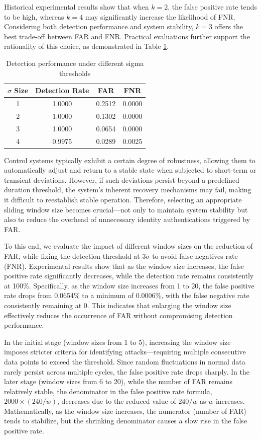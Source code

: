 \documentclass[sigconf]{acmart}
\begin{document}
Historical experimental results show that when $k = 2$, the false positive rate tends to be high, whereas $k = 4$ may significantly increase the likelihood of FNR. Considering both detection performance and system stability, $k = 3$ offers the best trade-off between FAR and FNR. Practical evaluations further support the rationality of this choice, as demonstrated in Table \ref{tab:sigma-performance}.

\begin{table}[htbp]
\centering
\caption{Detection performance under different sigma thresholds}
\begin{tabular}{cccc}
\toprule
\textbf{$\sigma$ Size} & \textbf{Detection Rate} & \textbf{FAR} & \textbf{FNR} \\
\midrule
1 & 1.0000 & 0.2512 & 0.0000 \\
2 & 1.0000 & 0.1302 & 0.0000 \\
3 & 1.0000 & 0.0654 & 0.0000 \\
4 & 0.9975 & 0.0289 & 0.0025 \\
\bottomrule
\end{tabular}
\label{tab:sigma-performance}
\end{table}

Control systems typically exhibit a certain degree of robustness, allowing them to automatically adjust and return to a stable state when subjected to short-term or transient deviations. However, if such deviations persist beyond a predefined duration threshold, the system’s inherent recovery mechanisms may fail, making it difficult to reestablish stable operation. Therefore, selecting an appropriate sliding window size becomes crucial—not only to maintain system stability but also to reduce the overhead of unnecessary identity authentications triggered by FAR.

To this end, we evaluate the impact of different window sizes on the reduction of FAR, while fixing the detection threshold at $3\sigma$ to avoid false negatives rate (FNR). Experimental results show that as the window size increases, the false positive rate significantly decreases, while the detection rate remains consistently at 100\%. Specifically, as the window size increases from 1 to 20, the false positive rate drops from 0.0654\% to a minimum of 0.0006\%, with the false negative rate consistently remaining at 0. This indicates that enlarging the window size effectively reduces the occurrence of FAR without compromising detection performance.

In the initial stage (window sizes from 1 to 5), increasing the window size imposes stricter criteria for identifying attacks—requiring multiple consecutive data points to exceed the threshold. Since random fluctuations in normal data rarely persist across multiple cycles, the false positive rate drops sharply. In the later stage (window sizes from 6 to 20), while the number of FAR remains relatively stable, the denominator in the false positive rate formula, $2000×(240/w)$, decreases due to the reduced value of $240/w$ as $w$ increases. Mathematically, as the window size increases, the numerator (number of FAR) tends to stabilize, but the shrinking denominator causes a slow rise in the false positive rate.
\end{document}
